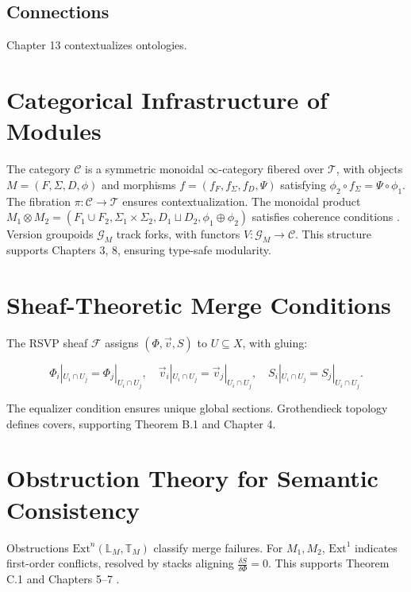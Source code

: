 \documentclass[12pt]{article}
\begin{document}
\subsection{Connections}
Chapter 13 contextualizes ontologies.

\appendix

\section{Categorical Infrastructure of Modules}
\label{app:categorical}

The category $\mathcal{C}$ is a symmetric monoidal $\infty$-category fibered over $\mathcal{T}$, with objects $M = (F, \Sigma, D, \phi)$ and morphisms $f = (f_F, f_\Sigma, f_D, \Psi)$ satisfying $\phi_2 \circ f_\Sigma = \Psi \circ \phi_1$. The fibration $\pi : \mathcal{C} \to \mathcal{T}$ ensures contextualization. The monoidal product $M_1 \otimes M_2 = (F_1 \cup F_2, \Sigma_1 \times \Sigma_2, D_1 \sqcup D_2, \phi_1 \oplus \phi_2)$ satisfies coherence conditions \cite{lurie2009higher}. Version groupoids $\mathcal{G}_M$ track forks, with functors $V : \mathcal{G}_M \to \mathcal{C}$. This structure supports Chapters 3, 8, ensuring type-safe modularity.

\section{Sheaf-Theoretic Merge Conditions}
\label{app:sheaf}

The RSVP sheaf $\mathcal{F}$ assigns $(\Phi, \vec{v}, S)$ to $U \subseteq X$, with gluing:

\[
\Phi_i|_{U_i \cap U_j} = \Phi_j|_{U_i \cap U_j}, \quad \vec{v}_i|_{U_i \cap U_j} = \vec{v}_j|_{U_i \cap U_j}, \quad S_i|_{U_i \cap U_j} = S_j|_{U_i \cap U_j}.
\]

The equalizer condition ensures unique global sections. Grothendieck topology defines covers, supporting Theorem B.1 and Chapter 4.

\section{Obstruction Theory for Semantic Consistency}
\label{app:obstruction}

Obstructions $\mathrm{Ext}^n(\mathbb{L}_M, \mathbb{T}_M)$ classify merge failures. For $M_1, M_2$, $\mathrm{Ext}^1$ indicates first-order conflicts, resolved by stacks aligning $\frac{\delta S}{\delta \Phi} = 0$. This supports Theorem C.1 and Chapters 5–7 \cite{illusie1971complexe}.
\end{document}

